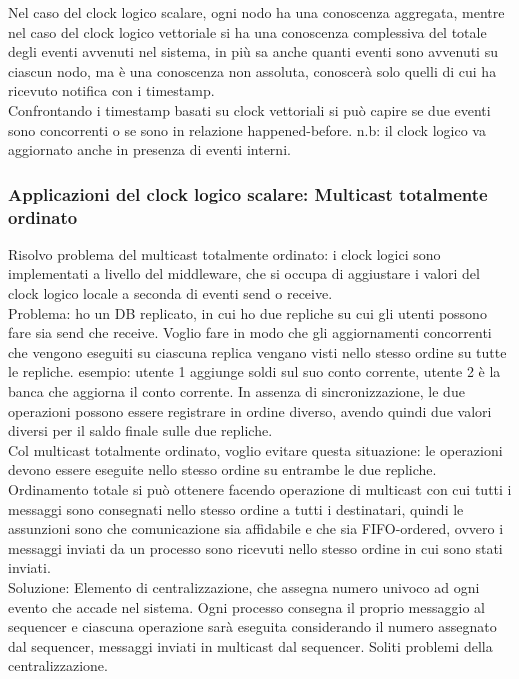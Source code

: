 \documentclass[16px]{article}
\begin{document}
Nel caso del clock logico scalare, ogni nodo ha una conoscenza aggregata, mentre nel caso del clock logico vettoriale si ha una conoscenza complessiva del totale degli eventi avvenuti nel sistema, in più sa anche quanti eventi sono avvenuti su ciascun nodo, ma è una conoscenza non assoluta, conoscerà solo quelli di cui ha ricevuto notifica con i timestamp.\\ Confrontando i timestamp basati su clock vettoriali si può capire se due eventi sono concorrenti o se sono in relazione happened-before. n.b: il clock logico va aggiornato anche in presenza di eventi interni.
\subsubsection{Applicazioni del clock logico scalare: Multicast totalmente ordinato}
Risolvo problema del multicast totalmente ordinato: i clock logici sono implementati a livello del middleware, che si occupa di aggiustare i valori del clock logico locale a seconda di eventi send o receive.\\ Problema: ho un DB replicato, in cui ho due repliche su cui gli utenti possono fare sia send che receive. Voglio fare in modo che gli aggiornamenti concorrenti che vengono eseguiti su ciascuna replica vengano visti nello stesso ordine su tutte le repliche. esempio: utente 1 aggiunge soldi sul suo conto corrente, utente 2 è la banca che aggiorna il conto corrente. In assenza di sincronizzazione, le due operazioni possono essere registrare in ordine diverso, avendo quindi due valori diversi per il saldo finale sulle due repliche.\\ Col multicast totalmente ordinato, voglio evitare questa situazione: le operazioni devono essere eseguite nello stesso ordine su entrambe le due repliche.\\ Ordinamento totale si può ottenere facendo operazione di multicast con cui tutti i messaggi sono consegnati nello stesso ordine a tutti i destinatari, quindi le assunzioni sono che comunicazione sia affidabile e che sia FIFO-ordered, ovvero i messaggi inviati da un processo sono ricevuti nello stesso ordine in cui sono stati inviati.\\ Soluzione:
Elemento di centralizzazione, che assegna numero univoco ad ogni evento che accade nel sistema. Ogni processo consegna il proprio messaggio al sequencer e ciascuna operazione sarà eseguita considerando il numero assegnato dal sequencer, messaggi inviati in multicast dal sequencer. Soliti problemi della centralizzazione.
\end{document}

